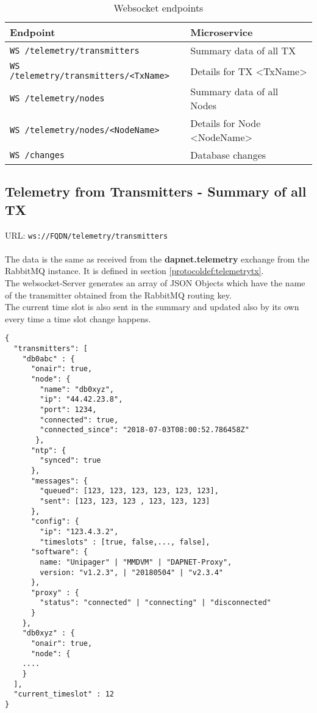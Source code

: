 \begin{table}[htbp]
  \label{tab:protocoldef:websocketapi}
  \begin{center}
    \begin{tabular}{|l|l|} \hline
      Endpoint & Microservice \\ \hline \hline
      \verb|WS /telemetry/transmitters| & Summary data of all TX \\ \hline
      \verb|WS /telemetry/transmitters/<TxName>| & Details for TX <TxName>\\ \hline
      \verb|WS /telemetry/nodes| & Summary data of all Nodes\\ \hline
      \verb|WS /telemetry/nodes/<NodeName>| & Details for Node <NodeName>\\ \hline
      \verb|WS /changes| & Database changes\\ \hline
    \end{tabular}
  \end{center}
  \caption{Websocket endpoints}
\end{table}


\subsection{Telemetry from Transmitters - Summary of all TX}
\label{protcoldef:websocketapi:telemetrytxsummary}
URL: \texttt{ws://FQDN/telemetry/transmitters}\\\\

The data is the same as received from the \textbf{dapnet.telemetry} exchange
from the RabbitMQ instance. It is defined in section
\ref{protocoldef:telemetrytx}.\\
The websocket-Server generates an array of JSON Objects which have the name of the transmitter obtained from the RabbitMQ routing key.\\
The current time slot is also sent in the summary and updated also by its own every time a time slot change happens.

\begin{lstlisting}
{
  "transmitters": [
    "db0abc" : {
      "onair": true,
      "node": {
        "name": "db0xyz",
        "ip": "44.42.23.8",
        "port": 1234,
        "connected": true,
        "connected_since": "2018-07-03T08:00:52.786458Z"
       },
      "ntp": {
        "synced": true
      },
      "messages": {
        "queued": [123, 123, 123, 123, 123, 123],
        "sent": [123, 123, 123 , 123, 123, 123]
      },
      "config": {
        "ip": "123.4.3.2",
        "timeslots" : [true, false,...,	false],
      "software": {
        name: "Unipager" | "MMDVM" | "DAPNET-Proxy",
        version: "v1.2.3", | "20180504" | "v2.3.4"
      },
      "proxy" : {
        "status": "connected" | "connecting" | "disconnected"
      }
    },
    "db0xyz" : {
      "onair": true,
      "node": {
    ....
    }
  ],
  "current_timeslot" : 12
}
\end{lstlisting}

